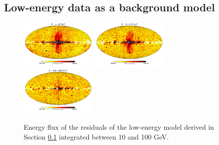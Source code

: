 \subsection{Low-energy data as a background model}
\label{sec:le_data_model}

\begin{figure}[t]
\includegraphics[width=0.33\textwidth]{plots/Mollweide_LowE_03-10GeV_flux_source_range_0.pdf}
\includegraphics[width=0.33\textwidth]{plots/Mollweide_LowE_03-10GeV_flux_source_range_1.pdf}
\includegraphics[width=0.33\textwidth]{plots/Mollweide_LowE_03-10GeV_flux_source_range_2.pdf}
\caption{Energy flux of the residuals of the low-energy model derived in Section \ref{sec:le_data_model}
integrated between 10 and 100 GeV. }
\label{fig:Maps_lowE}
\end{figure}

